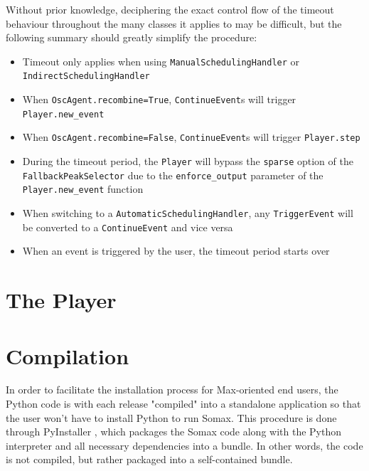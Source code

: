 Without prior knowledge, deciphering the exact control flow of the timeout behaviour throughout the many classes it applies to may be difficult, but the following summary should greatly simplify the procedure:

\begin{itemize}
	\item Timeout only applies when using \texttt{ManualSchedulingHandler} or \texttt{IndirectSchedulingHandler} 
	\item When \texttt{OscAgent.recombine=True}, \texttt{ContinueEvent}s will trigger \texttt{Player.new\_event}
	\item When \texttt{OscAgent.recombine=False}, \texttt{ContinueEvent}s will trigger \texttt{Player.step}
	\item During the timeout period, the \texttt{Player} will bypass the \texttt{sparse} option of the \texttt{FallbackPeakSelector} due to the \texttt{enforce\_output} parameter of the \texttt{Player.new\_event} function
	\item When switching to a \texttt{AutomaticSchedulingHandler}, any \texttt{TriggerEvent} will be converted to a \texttt{ContinueEvent} and vice versa
	\item When an event is triggered by the user, the timeout period starts over
\end{itemize}








\section{The Player}\label{ssec:2-player}


\section{Compilation}\label{ssec:2-compilation}

In order to facilitate the installation process for Max-oriented end users, the Python code is with each release "compiled" into a standalone application so that the user won't have to install Python to run Somax. This procedure is done through PyInstaller \cite{pyinstaller2023}, which packages the Somax code along with the Python interpreter and all necessary dependencies into a bundle. In other words, the code is not compiled, but rather packaged into a self-contained bundle.

